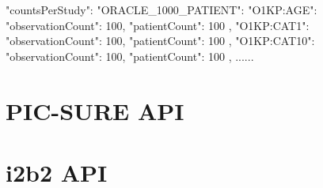 {
  "countsPerStudy": {
    "ORACLE_1000_PATIENT": {
      "O1KP:AGE": {
        "observationCount": 100,
        "patientCount": 100
      },
      "O1KP:CAT1": {
        "observationCount": 100,
        "patientCount": 100
      },
      "O1KP:CAT10": {
        "observationCount": 100,
        "patientCount": 100
      },
      ......
    }
  }
}



\section{PIC-SURE API}

\section{i2b2 API}
